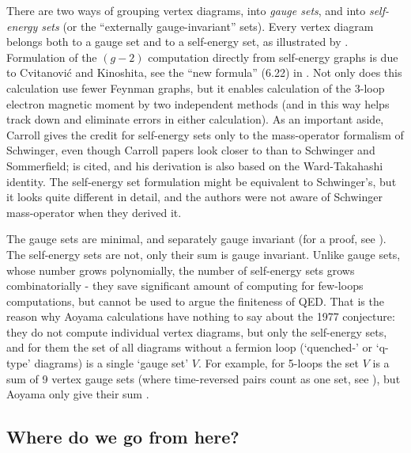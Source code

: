 There are two ways of grouping vertex diagrams, into \emph{gauge sets},
and into \emph{self-energy sets} (or the ``externally gauge-invariant''
sets). Every vertex diagram belongs both to a gauge set and to a
self-energy set, as illustrated by .
Formulation of the $(g-2)$ computation directly from self-energy graphs
is due to
{Cvitanovi\'{c} and Kinoshita}, see the ``new formula'' (6.22) in
. Not only does this calculation use fewer Feynman
graphs, but it enables calculation of the 3-loop electron magnetic moment
by two independent methods (and in this way helps track down and
eliminate errors in either calculation). As an important aside,
Carroll gives the credit for self-energy sets
only to the mass-operator formalism of Schwinger, even though Carroll papers
look closer to  than to Schwinger and Sommerfield;
 is cited, and his derivation is also based on the
Ward-Takahashi identity. The self-energy set
formulation might be equivalent to Schwinger's, but it looks quite
different in detail, and the authors were not aware of Schwinger
mass-operator when they derived it.

The gauge sets are minimal, and separately gauge invariant (for a proof,
see ). The self-energy sets are not, only their sum is
gauge invariant.
Unlike gauge sets, whose number grows polynomially, the number of
self-energy sets grows combinatorially - they save significant amount
of computing for few-loops computations, but cannot be used to argue the
finiteness of QED.
That is the reason why Aoyama
\etal{} calculations have
nothing to say about the 1977 conjecture: they do not compute
individual vertex diagrams, but only the self-energy sets, and for them
the set of all diagrams without a fermion loop (`quenched-' or `q-type'
diagrams) is a single `gauge set' $V$. For example, for 5-loops the set
$V$ is a sum of 9 vertex gauge sets (where time-reversed pairs count as
one set, see ), but Aoyama \etal{} only
give their sum .

\subsection{Where do we go from here?}
\label{sect:future}

